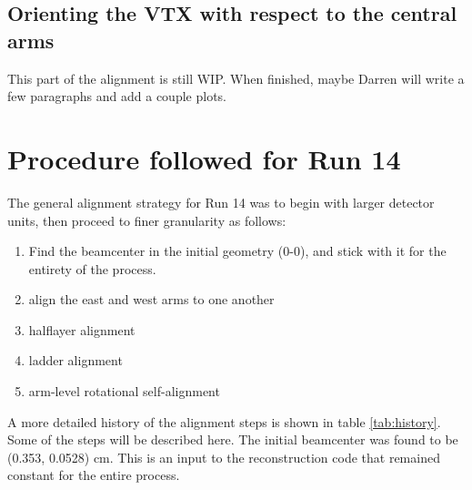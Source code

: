 \documentclass[12pt]{article}
\begin{document}
\subsection{Orienting the VTX with respect to the central arms}
This part of the alignment is still WIP. When finished, maybe Darren will write a few paragraphs and add a couple plots.

\section{Procedure followed for Run 14}
The general alignment strategy for Run 14 was to begin with larger detector units, then proceed to finer granularity as follows:
\begin{enumerate}
  \item Find the beamcenter in the initial geometry (0-0), and stick with it for the entirety of the process.
  \item align the east and west arms to one another
  \item halflayer alignment
  \item ladder alignment
  \item arm-level rotational self-alignment
\end{enumerate}
A more detailed history of the alignment steps is shown in table \ref{tab:history}. Some of the steps will be described here. The initial beamcenter was found to be (0.353, 0.0528) cm. This is an input to the reconstruction code that remained constant for the entire process. 
\end{document}
